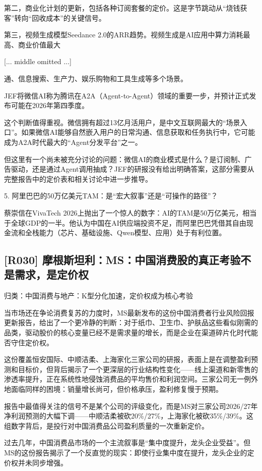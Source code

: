 \documentclass[11pt]{ctexart}
\begin{document}
第二，商业化计划的更新，包括各种订阅套餐的定价。这是字节跳动从“烧钱获客”转向“回收成本”的关键信号。

第三，视频生成模型Seedance 2.0的ARR趋势。视频生成是AI应用中算力消耗最高、商业价值最大

[... middle omitted ...]

通、信息搜索、生产力、娱乐购物和工具生成等多个场景。

JEF将微信AI称为腾讯在A2A（Agent-to-Agent）领域的重要一步，并预计正式发布可能在2026年第四季度。

这个判断值得重视。微信拥有超过13亿月活用户，是中文互联网最大的“场景入口”。如果微信AI能够自然嵌入用户的日常沟通、信息获取和任务执行中，它可能成为A2A时代最大的“Agent分发平台”之一。

但这里有一个尚未被充分讨论的问题：微信AI的商业模式是什么？是订阅制、广告驱动，还是通过Agent调用抽成？JEF的研报没有给出明确答案，这部分需要从完整报告中的定价表和相关讨论中进一步推导。

5. 阿里巴巴的50万亿美元TAM：是“宏大叙事”还是“可操作的路径”？

蔡崇信在VivaTech 2026上抛出了一个惊人的数字：AI的TAM是50万亿美元，相当于全球GDP的一半。他认为中国在AI供应端投资不足，而阿里巴巴凭借其自由现金流和全栈能力（芯片、基础设施、Qwen模型、应用）处于有利位置。

\subsection{[R030] 摩根斯坦利：MS：中国消费股的真正考验不是需求，是定价权}
{\small\color{refgray}归类：中国消费与地产：K型分化加速，定价权成为核心考验}

当市场还在争论消费复苏的力度时，MS最新发布的这份中国消费者行业风险回报更新报告，给出了一个更冷静的判断：对于纸巾、卫生巾、护肤品这些看似刚需的品类，驱动股价的核心变量已经不是需求量的增长，而是企业在渠道碎片化时代能否守住定价权。

这份覆盖恒安国际、中顺洁柔、上海家化三家公司的研报，表面上是在调整盈利预测和目标价，但背后揭示了一个更深层的行业结构性变化——线上渠道和新零售的渗透率提升，正在系统性地侵蚀消费品的平均售价和利润空间。三家公司无一例外地面临同样的困境：销量增长尚可，但价格承压，盈利修复慢于预期。

报告中最值得关注的信号不是某个公司的评级变化，而是MS对三家公司2026/27年净利润预测的大幅下调——中顺洁柔被砍20\%/27\%，上海家化被砍35\%/39\%。这组数字背后，是投行对中国消费品公司盈利质量的一次重新定价。

过去几年，中国消费品市场的一个主流叙事是“集中度提升，龙头企业受益”。但MS的这份报告揭示了一个反直觉的现实：即使行业集中度在提升，龙头企业的定价权并未同步增强。
\end{document}
